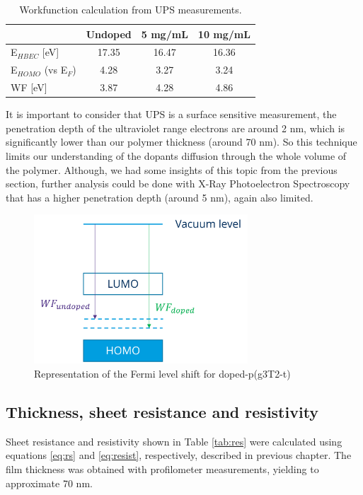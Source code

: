 \begin{table}[ht]
\centering
\caption{Workfunction calculation from UPS measurements.}
\begin{tabular}{l|c|c|c}
& Undoped & 5 mg/mL & 10 mg/mL \\\hline
E$_{HBEC}$ [eV] & 17.35 & 16.47 & 16.36\\
E$_{HOMO}$ (vs E$_{F}$) & 4.28 & 3.27 & 3.24\\
WF [eV] & 3.87 & 4.28 & 4.86\\\hline
\end{tabular}
\label{tab:ups}
\end{table}

It is important to consider that UPS is a surface sensitive measurement, the penetration depth of the ultraviolet range electrons are around 2 nm, which is significantly lower than our polymer thickness (around 70 nm). So this technique limits our understanding of the dopants diffusion through the whole volume of the polymer. Although, we had some insights of this topic from the previous section, further analysis could be done with X-Ray Photoelectron Spectroscopy that has a higher penetration depth (around 5 nm), again also limited. %

\begin{figure}[ht]
  \centering
  \includegraphics[width=8cm]{Images/pdf/WF.pdf}
  \caption[Representation of the Fermi level shift upon doping]{Representation of the Fermi level shift for doped-p(g3T2-t)}
  \label{fig:ups}
\end{figure}

\subsection{Thickness, sheet resistance and resistivity}

Sheet resistance and resistivity shown in Table \ref{tab:res} were calculated using equations \ref{eq:rs} and \ref{eq:resist}, respectively, described in previous chapter. The film thickness was obtained with profilometer measurements, yielding to approximate 70 nm.

